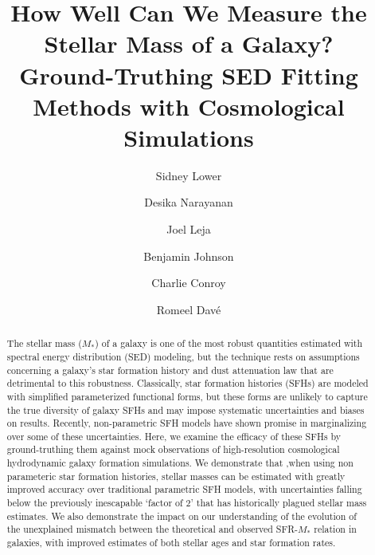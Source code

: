 \documentclass[twocolumn]{aastex62}
\begin{document}
\title{How Well Can We Measure the Stellar Mass of a Galaxy? \\ Ground-Truthing SED Fitting Methods with Cosmological Simulations
}



\author{Sidney Lower}

\author{Desika Narayanan}
\author{Joel Leja}
\author{Benjamin Johnson}
\author{Charlie Conroy}
\author{Romeel Dav{\'{e}}}


\begin{abstract}

The stellar mass ($M_*$) of a galaxy is one of the most robust quantities estimated with spectral energy distribution (SED) modeling, but the technique rests on assumptions concerning a galaxy's star formation history and dust attenuation law that are detrimental to this robustness.  Classically, star formation histories (SFHs) are modeled with simplified parameterized functional forms, but these forms are unlikely to capture the true diversity of galaxy SFHs and may impose systematic uncertainties and biases on results. Recently, non-parametric SFH models have shown promise in marginalizing over some of these uncertainties. Here, we examine the efficacy of these SFHs by ground-truthing them against mock observations of high-resolution cosmological hydrodynamic galaxy formation simulations. We demonstrate that ,when using non parameteric star formation histories, stellar masses can be estimated with greatly improved accuracy over traditional parametric SFH models, with uncertainties falling below the previously inescapable ‘factor of 2’ that has historically plagued stellar mass estimates. We also demonstrate the impact on our understanding of the evolution of the unexplained mismatch between the theoretical and observed SFR-$M_*$ relation in galaxies, with improved estimates of both stellar ages and star formation rates. 

\end{abstract}
\end{document}
